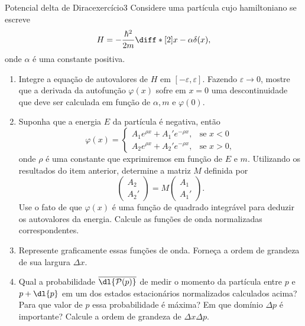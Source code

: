 \begin{exercício}{Potencial delta de Dirac}{exercício3}
    Considere uma partícula cujo hamiltoniano se escreve
    \begin{equation*}
        H = - \frac{\hbar^2}{2m} \diff*[2]{}{x} - \alpha \delta(x),
    \end{equation*}
    onde \(\alpha\) é uma constante positiva.
    \begin{enumerate}[label=(\alph*)]
        \item Integre a equação de autovalores de \(H\) em \([-\varepsilon, \varepsilon]\). Fazendo \(\varepsilon \to 0\), mostre que a derivada da autofunção \(\varphi(x)\) sofre em \(x = 0\) uma descontinuidade que deve ser calculada em função de \(\alpha, m\) e \(\varphi(0)\).
        \item Suponha que a energia \(E\) da partícula é negativa, então
            \begin{equation*}
                \varphi(x) = \begin{cases}
                    A_1 e^{\rho x} + A_1' e^{-\rho x},&\text{se }x < 0\\
                    A_2 e^{\rho x} + A_2' e^{-\rho x},&\text{se }x > 0,
                \end{cases}
            \end{equation*}
            onde \(\rho\) é uma constante que exprimiremos em função de \(E\) e \(m\). Utilizando os resultados do item anterior, determine a matriz \(M\) definida por
            \begin{equation*}
                \begin{pmatrix}
                    A_2\\
                    A_2'
                \end{pmatrix}=
                M
                \begin{pmatrix}
                    A_1\\
                    A_1'
                \end{pmatrix}.
            \end{equation*}
            Use o fato de que \(\varphi(x)\) é uma função de quadrado integrável para deduzir os autovalores da energia. Calcule as funções de onda normalizadas correspondentes.

        \item Represente graficamente essas funções de onda. Forneça a ordem de grandeza de sua largura \(\Delta x\).
        \item Qual a probabilidade \(\overline{\dl{\mathcal{P}(p)}}\) de medir o momento da partícula entre \(p\) e \(p + \dl{p}\) em um dos estados estacionários normalizados calculados acima? Para que valor de \(p\) essa probabilidade é máxima? Em que domínio \(\Delta p\) é importante? Calcule a ordem de grandeza de \(\Delta x \Delta p\).
    \end{enumerate}
\end{exercício}
